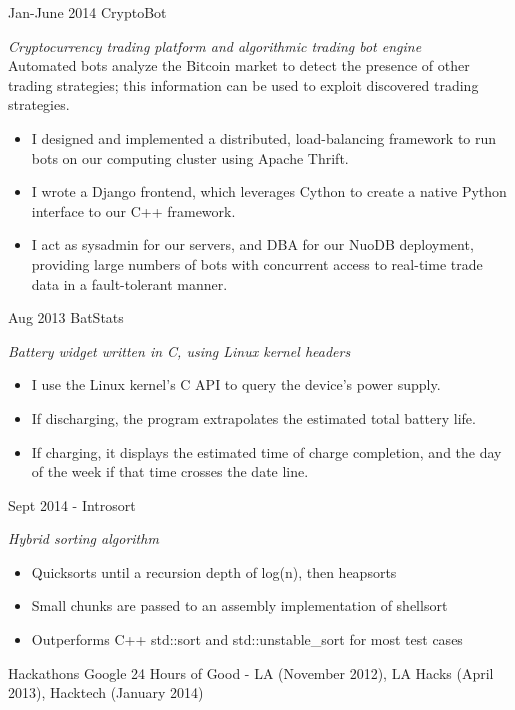 \documentclass[]{mills-cv} %
\begin{document}
\begin{entrylist}
\entry
{Jan-June 2014 }
{CryptoBot}
{}
{\emph{Cryptocurrency trading platform and algorithmic trading bot engine} \\
Automated bots analyze the Bitcoin market to detect the presence of other trading strategies; this information can be used to exploit discovered trading strategies.
\begin{itemize}
\item I designed and implemented a distributed, load-balancing framework to run bots on our computing cluster using Apache Thrift.
\item I wrote a Django frontend, which leverages Cython to create a native Python interface to our C++ framework.
\item I act as sysadmin for our servers, and DBA for our NuoDB deployment, providing large numbers of bots with concurrent access to real-time trade data in a fault-tolerant manner.
\end{itemize}
}

\entry
{Aug 2013}
{BatStats}
{}
{\emph{Battery widget written in C, using Linux kernel headers}
\begin{itemize}
\item I use the Linux kernel's C API to query the device's power supply.
\item If discharging, the program extrapolates the estimated total battery life.
\item If charging, it displays the estimated time of charge completion, and the day of the week if that time crosses the date line.
\end{itemize}
}

\entry
{Sept 2014 -}
{Introsort}
{}
{\emph{Hybrid sorting algorithm}
\begin{itemize}
\item Quicksorts until a recursion depth of log(n), then heapsorts
\item Small chunks are passed to an assembly implementation of shellsort
\item Outperforms C++ std::sort and std::unstable\_sort for most test cases
\end{itemize}
}


\entry
{}
{Hackathons}
{}
{Google 24 Hours of Good - LA (November 2012), LA Hacks (April 2013), Hacktech (January 2014)}
\end{entrylist}
\end{document}
